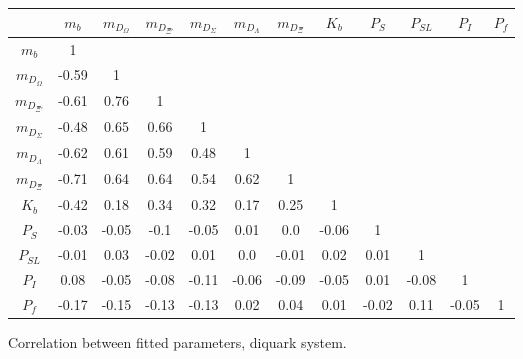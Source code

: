 \begin{tabular}{c | c c c c c c c c c c c}\hline \hline
         &  $m_{b}$ & $m_{D_{\Omega}}$ & $m_{D_{\Xi'}}$ & $m_{D_{\Sigma}}$ & $m_{D_{\Lambda}}$ & $m_{D_{\Xi}}$ &  $K_b$   & $P_S$ & $P_{SL}$ & $P_{I}$ & $P_f$ \\ \hline
 $m_{b}$ &     1   &   &   &   &    &   &   &  & & &  \\ 
$m_{D_{\Omega}}$ & -0.59 &  1   &   &  &   &   &   &    &   &   &  \\ 
$m_{D_{\Xi'}}$ & -0.61 & 0.76 &  1   &   &   &   &  &  &  &  & \\ 
$m_{D_{\Sigma}}$ & -0.48 & 0.65 & 0.66 &  1   &   &   &   &   &   &  &  \\ 
$m_{D_{\Lambda}}$ & -0.62 & 0.61 & 0.59 & 0.48 &  1   &   &   &   &    &   &  \\ 
$m_{D_{\Xi}}$ & -0.71 & 0.64 & 0.64 & 0.54 & 0.62 &  1   &   &   &   &    &   \\ 
 $K_b$   & -0.42 & 0.18 & 0.34 & 0.32 & 0.17 & 0.25 & 1   &   &   &   & \\ 
 $P_S$   & -0.03 & -0.05 & -0.1 & -0.05 & 0.01 & 0.0 & -0.06 & 1   &   &   & \\ 
 $P_{SL}$& -0.01 & 0.03 & -0.02 & 0.01 & 0.0 & -0.01 & 0.02 & 0.01 & 1   &   &  \\ 
 $P_I$   & 0.08 & -0.05 & -0.08 & -0.11 & -0.06 & -0.09 & -0.05 & 0.01 & -0.08 & 1   & \\ 
 $P_f$   & -0.17 & -0.15 & -0.13 & -0.13 & 0.02 & 0.04 & 0.01 & -0.02 & 0.11 & -0.05 & 1 \\ \hline \hline
\end{tabular}
\caption{Correlation between fitted parameters, diquark system.}
\label{tab:diquark_corr}
